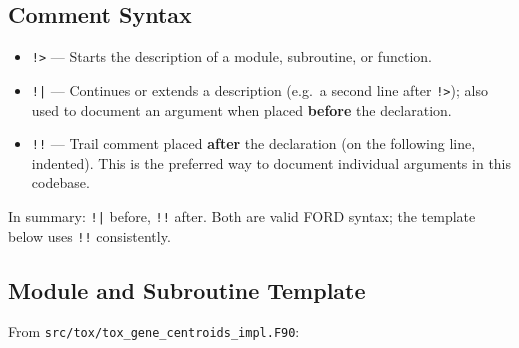 \documentclass{article}
\begin{document}
\subsection{Comment Syntax}

\begin{itemize}
  \item \texttt{!>} — Starts the description of a module, subroutine, or function.
  \item \texttt{!|} — Continues or extends a description (e.g.\ a second line after \texttt{!>}); also used to document an argument when placed \textbf{before} the declaration.
  \item \texttt{!!} — Trail comment placed \textbf{after} the declaration (on the following line, indented). This is the preferred way to document individual arguments in this codebase.
\end{itemize}

\noindent In summary: \texttt{!|} before, \texttt{!!} after. Both are valid FORD syntax; the template below uses \texttt{!!} consistently.

\subsection{Module and Subroutine Template}

\noindent From \texttt{src/tox/tox\_gene\_centroids\_impl.F90}:
\end{document}
